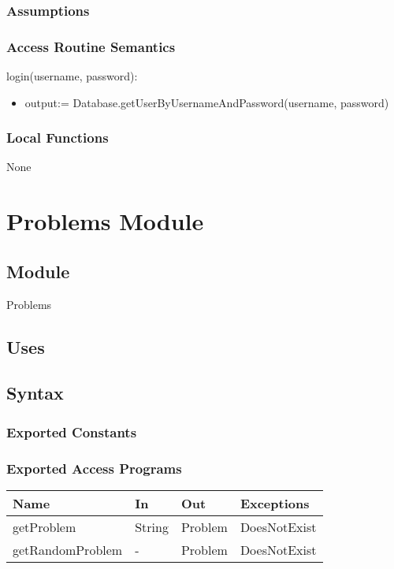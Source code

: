 \documentclass[12pt, titlepage]{article}
\begin{document}
\subsubsection{Assumptions}

\subsubsection{Access Routine Semantics}

\noindent login(username, password):

\begin{itemize}
\item output:= Database.getUserByUsernameAndPassword(username, password)
\end{itemize}


\subsubsection{Local Functions}
None

\newpage
\section{Problems Module} \label{Problems} 

\subsection{Module}

Problems

\subsection{Uses}


\subsection{Syntax}

\subsubsection{Exported Constants}

\subsubsection{Exported Access Programs}

\begin{center}
\begin{tabular}{ |  p{4cm} | p{2cm} |  p{2cm} | p{3cm} | }
\hline
\textbf{Name} & \textbf{In} & \textbf{Out} & \textbf{Exceptions} \\
\hline
getProblem & String & Problem & DoesNotExist \\
getRandomProblem & -  & Problem & DoesNotExist \\
\hline
\end{tabular}
\end{center}
\end{document}
